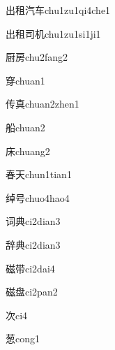 \begin{verbete}[5;10;7;4]{出租汽车}{chu1zu1qi4che1}
\end{verbete}
\begin{verbete}[5;10;5;6]{出租司机}{chu1zu1si1ji1}
\end{verbete}
\begin{verbete}[12;8]{厨房}{chu2fang2}
\end{verbete}
\begin{verbete}[9]{穿}{chuan1}
\end{verbete}
\begin{verbete}[6;10]{传真}{chuan2zhen1}
\end{verbete}
\begin{verbete}[11]{船}{chuan2}
\end{verbete}
\begin{verbete}[7]{床}{chuang2}
\end{verbete}
\begin{verbete}[9;4]{春天}{chun1tian1}
\end{verbete}
\begin{verbete}[11;5]{绰号}{chuo4hao4}
\end{verbete}
\begin{verbete}[7;8]{词典}{ci2dian3}
\end{verbete}
\begin{verbete}[13;8]{辞典}{ci2dian3}
\end{verbete}
\begin{verbete}[14;9]{磁带}{ci2dai4}
\end{verbete}
\begin{verbete}[14;11]{磁盘}{ci2pan2}
\end{verbete}
\begin{verbete}[6]{次}{ci4}
\end{verbete}
\begin{verbete}[12]{葱}{cong1}
\end{verbete}
